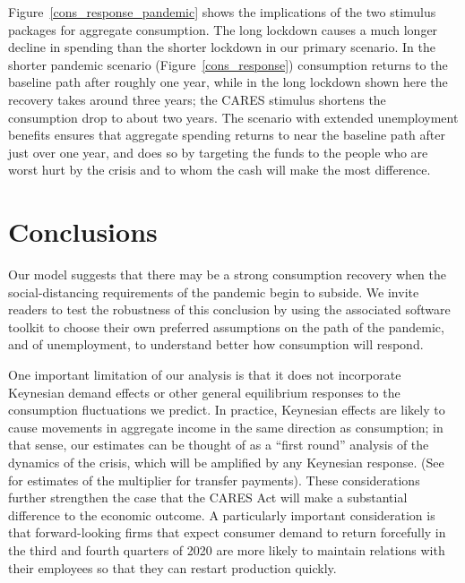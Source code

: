 \documentclass[titlepage,letterpaper]{\econtex}
\begin{document}
Figure~\ref{cons_response_pandemic} shows the implications of the two stimulus packages for aggregate consumption.
The long lockdown causes a much longer decline in spending than the shorter lockdown in our primary scenario. In the shorter pandemic scenario (Figure~\ref{cons_response}) consumption returns to the baseline path after roughly one year, while in the long lockdown shown here the recovery takes around three years;
the CARES stimulus shortens the consumption drop to about two years.
The scenario with extended unemployment benefits ensures that aggregate spending returns to near the baseline path after just over one year, and does so by targeting the funds to the people who are worst hurt by the crisis and to whom the cash will make the most difference.

\section{Conclusions}

Our model suggests that there may be a strong consumption recovery when the social-distancing requirements of the pandemic begin to subside.
We invite readers to test the robustness of this conclusion by using the associated software toolkit to choose their own preferred assumptions on the path of the pandemic, and of unemployment, to understand better how consumption will respond.

One important limitation of our analysis is that it does not incorporate Keynesian demand effects or other general equilibrium responses to the consumption fluctuations we predict.
In practice, Keynesian effects are likely to cause movements in aggregate income in the same direction as consumption; in that sense, our estimates can be thought of as a ``first round'' analysis of the dynamics of the crisis, which will be amplified by any Keynesian response.  (See \cite{bayer_corona} for estimates of the multiplier for transfer payments).
These considerations further strengthen the case that the CARES Act will make a substantial difference to the economic outcome.
A particularly important consideration is that forward-looking firms that expect consumer demand to return forcefully in the third and fourth quarters of 2020 are more likely to maintain relations with their employees so that they can restart production quickly.
\end{document}
